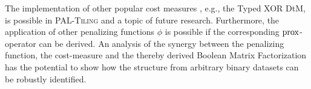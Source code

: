 The implementation of other popular cost measures , e.g., the Typed XOR DtM, is possible in \textsc{PAL-Tiling} and a topic of future research. Furthermore, the application of other penalizing functions $\phi$ is possible if the corresponding $\operatorname{prox}$-operator can be derived. An analysis of the synergy between the penalizing function, the cost-measure and the thereby derived Boolean Matrix Factorization has the potential to show how the structure from arbitrary binary datasets can be robustly identified.